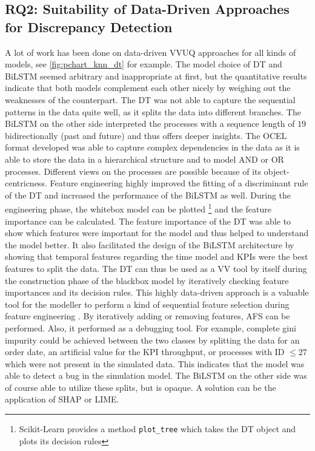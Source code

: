 \subsection{RQ2: Suitability of Data-Driven Approaches for Discrepancy Detection}
\label{sec:discussion_rq2}
A lot of work has been done on data-driven VVUQ approaches for all kinds of models, see \autoref{fig:pchart_knn_dt} for example. The model choice of DT and BiLSTM seemed arbitrary and inappropriate at first, but the quantitative results indicate that both models complement each other nicely by weighing out the weaknesses of the counterpart. The DT was not able to capture the sequential patterns in the data quite well, as it splits the data into different branches. The BiLSTM on the other side interpreted the processes with a sequence length of $19$ bidirectionally (past and future) and thus offers deeper insights. The OCEL format developed was able to capture complex dependencies in the data as it is able to store the data in a hierarchical structure and to model AND or OR processes. Different views on the processes are possible because of its object-centricness. Feature engineering highly improved the fitting of a discriminant rule of the DT and increased the performance of the BiLSTM as well. During the engineering phase, the whitebox model can be plotted \footnote{Scikit-Learn provides a method \texttt{plot_tree} which takes the DT object and plots its decision rules} and the feature importance can be calculated. The feature importance of the DT was able to show which features were important for the model and thus helped to understand the model better. It also facilitated the design of the BiLSTM architecture by showing that temporal features regarding the time model and KPIs were the best features to split the data. The DT can thus be used as a VV tool by itself during the construction phase of the blackbox model by iteratively checking feature importances and its decision rules. This highly data-driven approach is a valuable tool for the modeller to perform a kind of sequential feature selection during feature engineering \autocite{pudil1994floating}. By iteratively adding or removing features, AFS can be performed. Also, it performed as a debugging tool. For example, complete gini impurity could be achieved between the two classes by splitting the data for an order date, an artificial value for the KPI throughput, or processes with ID $\le 27$ which were not present in the simulated data. This indicates that the model was able to detect a bug in the simulation model. The BiLSTM on the other side was of course able to utilize these splits, but is opaque. A solution can be the application of SHAP or LIME.

